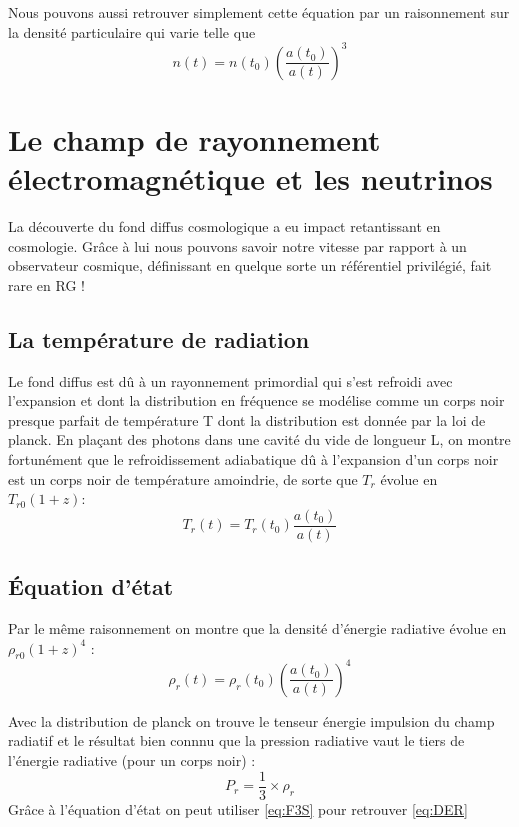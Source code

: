 \documentclass[10pt, a4paper]{report}
\numberwithin{equation}{subsection}
\begin{document}
Nous pouvons aussi retrouver simplement cette équation par un raisonnement sur la densité particulaire qui varie telle que 
\begin{equation} \label{eq:NP}
\boxed{n(t) = n(t_0) \left(\frac{a(t_0)}{a(t)}\right)^3}
\end{equation}

\section{Le champ de rayonnement électromagnétique et les neutrinos}
La découverte du fond diffus cosmologique a eu impact retantissant en cosmologie. Grâce à lui nous pouvons savoir notre vitesse par rapport à un observateur cosmique, définissant en quelque sorte un référentiel privilégié, fait rare en RG ! 
\subsection{La température de radiation}
Le fond diffus est dû à un rayonnement primordial qui s'est refroidi avec l'expansion et dont la distribution en fréquence se modélise comme un corps noir presque parfait de température T dont la distribution est donnée par la loi de planck. En plaçant des photons dans une cavité du vide de longueur L, on montre fortunément que le refroidissement adiabatique dû à l'expansion d'un corps noir est un corps noir de température amoindrie, de sorte que $T_r$ évolue en $T_{r0} (1+z)$:
\begin{equation} \label{eq:TRRA}
\boxed{T_r(t) = T_r(t_0) \frac{a(t_0)}{a(t)}}
\end{equation}
\subsection{\uppercase{é}quation d'état}
Par le même raisonnement on montre que la densité d'énergie radiative évolue en $\rho_{r0} (1+z)^4$ :
\begin{equation} \label{eq:DER}
\boxed{\rho_r(t) = \rho_r(t_0)  \left({\frac{a(t_0)}{a(t)}}\right)^4}
\end{equation}

Avec la distribution de planck on trouve le tenseur énergie impulsion du champ radiatif et le résultat bien connnu que la pression radiative vaut le tiers de l'énergie radiative (pour un corps noir) :
\begin{equation} \label{eq:EER}
\boxed{P_r = \frac{1}{3} \times \rho_r}
\end{equation}
Grâce à l'équation d'état on peut utiliser \ref{eq:F3S} pour retrouver \ref{eq:DER} 
\end{document}

